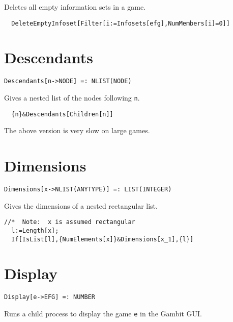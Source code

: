 \noindent
Deletes all empty information sets in a game.  

\udfbody
\begin{verbatim}
  DeleteEmptyInfoset[Filter[i:=Infosets[efg],NumMembers[i]=0]]
\end{verbatim} 


\section*{Descendants}\label{ExtDescendants}
\begin{verbatim}
Descendants[n->NODE] =: NLIST(NODE) 
\end{verbatim}

\noindent
Gives a nested list of the nodes following \verb+n+.

\udfbody
\begin{verbatim}
  {n}&Descendants[Children[n]]
\end{verbatim} 

\note The above version is very slow on large games.


\section*{Dimensions}\label{ExtDimensions}
\begin{verbatim}
Dimensions[x->NLIST(ANYTYPE)] =: LIST(INTEGER) 
\end{verbatim}

\noindent
Gives the dimensions of a nested rectangular list. 

\udfbody
\begin{verbatim}
//*  Note:  x is assumed rectangular
  l:=Length[x];
  If[IsList[l],{NumElements[x]}&Dimensions[x_1],{l}]
\end{verbatim} 


\section*{Display}\label{ExtDisplay}
\begin{verbatim}
Display[e->EFG] =: NUMBER 
\end{verbatim}

\noindent
Runs a child process to display the game \verb+e+ in the Gambit GUI. 

